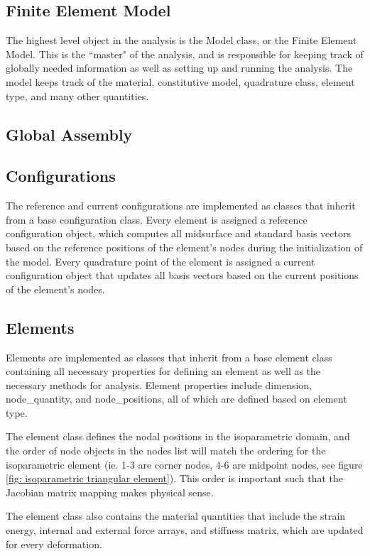 \documentclass[]{spie}  %
\begin{document}
\subsection{Finite Element Model}
The highest level object in the analysis is the Model class, or the Finite Element Model. This is the ``master" of the analysis, and is responsible for keeping track of globally needed information as well as setting up and running the analysis. The model keeps track of the material, constitutive model, quadrature class, element type, and many other quantities.

\subsection{Global Assembly}

\subsection{Configurations}
The reference and current configurations are implemented as classes that inherit from a base configuration class. Every element is assigned a reference configuration object, which computes all midsurface and standard basis vectors based on the reference positions of the element's nodes during the initialization of the model. Every quadrature point of the element is assigned a current configuration object that updates all basis vectors based on the current positions of the element's nodes. 

\subsection{Elements}
Elements are implemented as classes that inherit from a base element class containing all necessary properties for defining an element as well as the necessary methods for analysis. Element properties include dimension, node\_quantity, and node\_positions, all of which are defined based on element type. 

The element class defines the nodal positions in the isoparametric domain, and the order of node objects in the nodes list will match the ordering for the isoparametric element (ie. 1-3 are corner nodes, 4-6 are midpoint nodes, see figure \ref{fig: isoparametric triangular element}). This order is important such that the Jacobian matrix mapping makes physical sense. 

The element class also contains the material quantities that include the strain energy, internal and external force arrays, and stiffness matrix, which are updated for every deformation.
\end{document}

